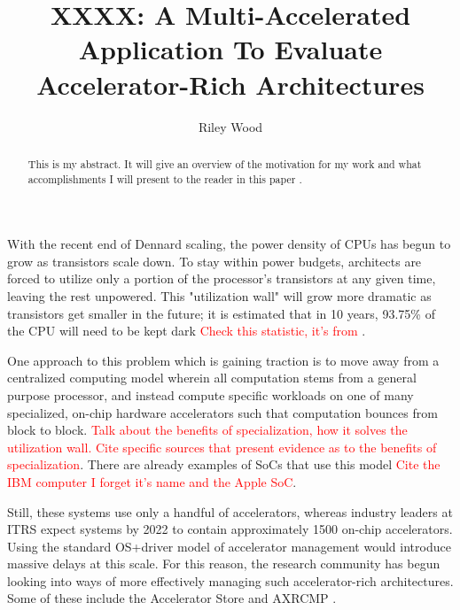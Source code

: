 \documentclass[journal]{IEEEtran}
\title{XXXX: A Multi-Accelerated Application To Evaluate Accelerator-Rich Architectures}
\author{Riley Wood}
\newcommand\myworries[1]{\textcolor{red}{#1}} %
\begin{document}
\maketitle

\begin{abstract}
This is my abstract. It will give an overview of the motivation for my work and what accomplishments I will present to the reader in this paper \cite{Lyons:2010}\cite{Cong:2012}\cite{Taylor:2012}.
\end{abstract}

With the recent end of Dennard scaling, the power density of CPUs has begun to grow as transistors scale down. To stay within power budgets, architects are forced to utilize only a portion of the processor's transistors at any given time, leaving the rest unpowered. This "utilization wall" will grow more dramatic as transistors get smaller in the future; it is estimated that in 10 years, 93.75\% of the CPU will need to be kept dark \myworries{Check this statistic, it's from \cite{Taylor:2012}}.

One approach to this problem which is gaining traction is to move away from a centralized computing model wherein all computation stems from a general purpose processor, and instead compute specific workloads on one of many specialized, on-chip hardware accelerators such that computation bounces from block to block. \myworries{Talk about the benefits of specialization, how it solves the utilization wall. Cite specific sources that present evidence as to the benefits of specialization}. There are already examples of SoCs that use this model \myworries{Cite the IBM computer I forget it's name and the Apple SoC}.

Still, these systems use only a handful of accelerators, whereas industry leaders at ITRS expect systems by 2022 to contain approximately 1500 on-chip accelerators. Using the standard OS+driver model of accelerator management would introduce massive delays at this scale. For this reason, the research community has begun looking into ways of more effectively managing such accelerator-rich architectures. Some of these include the Accelerator Store \cite{Lyons:2010} and AXRCMP \cite{Cong:2012}.




\end{document}
